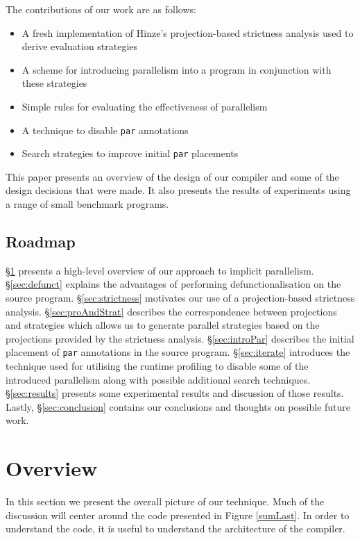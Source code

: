 The contributions of our work are as follows:

\begin{itemize}
    \item A fresh implementation of Hinze's projection-based strictness analysis \citep{hinze1995projection}
        used to derive evaluation strategies
    \item A scheme for introducing parallelism into a program in conjunction with these
        strategies
    \item Simple rules for evaluating the effectiveness of parallelism
    \item A technique to disable \verb-par- annotations
    \item Search strategies to improve initial \verb-par- placements
\end{itemize}


This paper presents an overview of the design of our compiler and some of the
design decisions that were made.  It also presents the results of experiments
using a range of small benchmark programs.

\subsection{Roadmap}

\S\ref{sec:overview} presents a high-level overview of our approach to implicit
parallelism.  \S\ref{sec:defunct} explains the advantages of performing
defunctionalisation on the source program. \S\ref{sec:strictness} motivates our
use of a projection-based strictness analysis.  \S\ref{sec:proAndStrat}
describes the correspondence between projections and strategies which allows us
to generate parallel strategies based on the projections provided by the
strictness analysis. \S\ref{sec:introPar} describes the initial placement of
\verb-par- annotations in the source program. \S\ref{sec:iterate} introduces
the technique used for utilising the runtime profiling to disable some of the
introduced parallelism along with possible additional search techniques.
\S\ref{sec:results} presents some experimental results and discussion of those
results. Lastly, \S\ref{sec:conclusion} contains our conclusions and thoughts
on possible future work.

\section{Overview}
\label{sec:overview}

In this section we present the overall picture of our technique. Much of the
discussion will center around the code presented in Figure \ref{sumLast}. In
order to understand the code, it is useful to understand the architecture of the
compiler.

